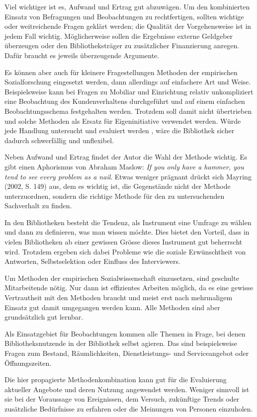 \documentclass[a4paper,
fontsize=11pt,
oneside,
numbers=noperiodatend,
parskip=half-,
bibliography=totoc,
final
]{scrartcl}
\begin{document}
Viel wichtiger ist es, Aufwand und Ertrag gut abzuwägen. Um den
kombinierten Einsatz von Befragungen und Beobachtungen zu rechtfertigen,
sollten wichtige oder weitreichende Fragen geklärt werden; die Qualität
der Vorgehensweise ist in jedem Fall wichtig. Möglicherweise sollen die
Ergebnisse externe Geldgeber überzeugen oder den Bibliotheksträger zu
zusätzlicher Finanzierung anregen. Dafür braucht es jeweils überzeugende
Argumente.

Es können aber auch für kleinere Fragestellungen Methoden der
empirischen Sozialforschung eingesetzt werden, dann allerdings auf
einfachere Art und Weise. Beispielsweise kann bei Fragen zu Mobiliar und
Einrichtung relativ unkompliziert eine Beobachtung des Kundenverhaltens
durchgeführt und auf einem einfachen Beobachtungsschema festgehalten
werden. Trotzdem soll damit nicht übertrieben und solche Methoden als
Ersatz für Eigeninitiative verwendet werden. Würde jede Handlung
untersucht und evaluiert werden , wäre die Bibliothek sicher dadurch
schwerfällig und unflexibel.

Neben Aufwand und Ertrag findet der Autor die Wahl der Methode wichtig.
Es gibt einen Aphorismus von Abraham Maslow: \emph{If you only have a
hammer, you tend to see every problem as a nail}. Etwas weniger prägnant
drückt sich Mayring (2002, S. 149) aus, dem es wichtig ist, die
Gegenstände nicht der Methode unterzuordnen, sondern die richtige
Methode für den zu untersuchenden Sachverhalt zu finden.

In den Bibliotheken besteht die Tendenz, als Instrument eine Umfrage zu
wählen und dann zu definieren, was man wissen möchte. Dies bietet den
Vorteil, dass in vielen Bibliotheken ab einer gewissen Grösse dieses
Instrument gut beherrscht wird. Trotzdem ergeben sich dabei Probleme wie
die soziale Erwünschtheit von Antworten, Selbstselektion oder Einfluss
des Interviewers.

Um Methoden der empirischen Sozialwissenschaft einzusetzen, sind
geschulte Mitarbeitende nötig. Nur dann ist effizientes Arbeiten
möglich, da es eine gewisse Vertrautheit mit den Methoden braucht und
meist erst nach mehrmaligem Einsatz gut damit umgegangen werden kann.
Alle Methoden sind aber grundsätzlich gut lernbar.

Als Einsatzgebiet für Beobachtungen kommen alle Themen in Frage, bei
denen Bibliotheksnutzende in der Bibliothek selbst agieren. Das sind
beispielsweise Fragen zum Bestand, Räumlichkeiten, Dienstleistungs- und
Serviceangebot oder Öffnungszeiten.

Die hier propagierte Methodenkombination kann gut für die Evaluierung
aktueller Angebote und deren Nutzung angewendet werden. Weniger sinnvoll
ist sie bei der Voraussage von Ereignissen, dem Versuch, zukünftige
Trends oder zusätzliche Bedürfnisse zu erfahren oder die Meinungen von
Personen einzuholen.
\end{document}
